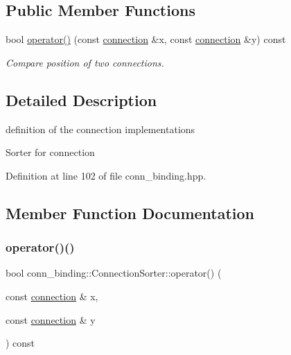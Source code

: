 \subsection*{Public Member Functions}
\begin{DoxyCompactItemize}
\item 
bool \hyperlink{structconn__binding_1_1ConnectionSorter_add0f9a8b0a38baf97690051a647c84bd}{operator()} (const \hyperlink{classconn__binding_aefee92bcc9e59d19b7a3e55e2cbdf615}{connection} \&x, const \hyperlink{classconn__binding_aefee92bcc9e59d19b7a3e55e2cbdf615}{connection} \&y) const
\begin{DoxyCompactList}\small\item\em Compare position of two connections. \end{DoxyCompactList}\end{DoxyCompactItemize}


\subsection{Detailed Description}
definition of the connection implementations 

Sorter for connection 

Definition at line 102 of file conn\+\_\+binding.\+hpp.



\subsection{Member Function Documentation}
\mbox{\label{structconn__binding_1_1ConnectionSorter_add0f9a8b0a38baf97690051a647c84bd}} 
\subsubsection{\texorpdfstring{operator()()}{operator()()}}
{\footnotesize\ttfamily bool conn\+\_\+binding\+::\+Connection\+Sorter\+::operator() (\begin{DoxyParamCaption}\item[{const \hyperlink{classconn__binding_aefee92bcc9e59d19b7a3e55e2cbdf615}{connection} \&}]{x,  }\item[{const \hyperlink{classconn__binding_aefee92bcc9e59d19b7a3e55e2cbdf615}{connection} \&}]{y }\end{DoxyParamCaption}) const}



